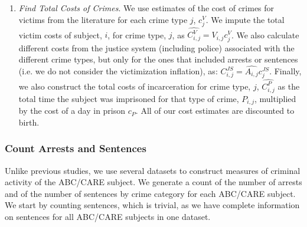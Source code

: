 \begin{enumerate}
\item \textit{Find Total Costs of Crimes}. We use estimates of the cost of crimes for victims from the literature for each crime type $j$, $c_j^V$. We impute the total victim costs of subject, $i$, for crime type, $j$, as $\widehat{C_{i,j}^V}=\widehat{V_{i,j}} c_j^V$. We also calculate different costs from the justice system (including police) associated with the different crime types, but only for the ones that included arrests or sentences (i.e. we do not consider the victimization inflation), as: $C_{i,j}^{JS}=\widehat{A_{i,j}} c_j^{JS}$. Finally, we also construct the total costs of incarceration for crime type, $j$, $\widehat{C_{i,j}^{P}}$ as the total time the subject was imprisoned for that type of crime, $P_{i,j}$, multiplied by the cost of a day in prison $c_P$. All of our cost estimates are discounted to birth.
\end{enumerate}


\subsubsection{Count Arrests and Sentences}
\noindent Unlike previous studies, we use several datasets to construct measures of criminal activity of the ABC/CARE subject. We generate a count of the number of arrests and of the number of sentences by crime category for each ABC/CARE subject. We start by counting sentences, which is trivial, as we have complete information on sentences for all ABC/CARE subjects in one dataset. \\

